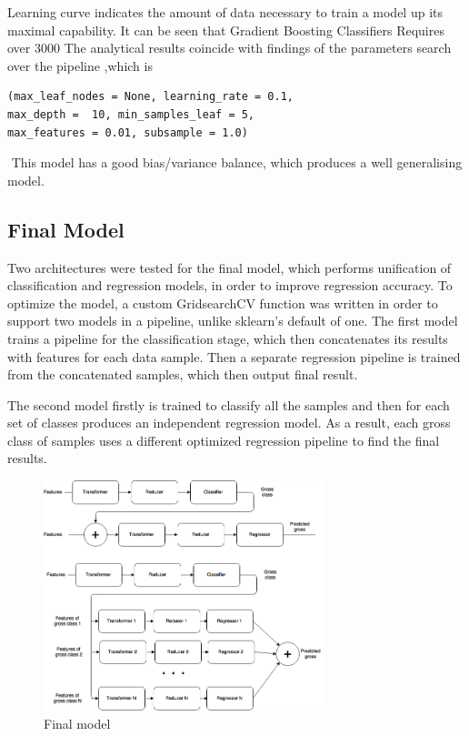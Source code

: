 Learning curve indicates the amount of data necessary to train a model up its maximal capability. It can be seen that Gradient Boosting Classifiers Requires over 3000
The analytical results coincide with findings of the parameters search over the pipeline ,which is \begin{verbatim}(max_leaf_nodes = None, learning_rate = 0.1,
max_depth =  10, min_samples_leaf = 5, 
max_features = 0.01, subsample = 1.0) \end{verbatim}­ This model has a good bias/variance balance, which produces a well generalising model.

\subsection{Final Model}
Two architectures were tested for the final model, which performs unification of classification and regression models, in order to improve regression accuracy. To optimize the model, a custom GridsearchCV function was written in order to support two models in a pipeline, unlike sklearn’s default of one. The first model trains a pipeline for the classification stage, which then concatenates its results with features for each data sample. Then a separate regression pipeline is trained from the concatenated samples, which then output final result.


The second model firstly is trained to classify all the samples and then for each set of classes produces an independent regression model. As a result, each gross class of samples uses a different optimized regression pipeline to find the final results.


\begin{figure}[h]
\centering
\includegraphics[width=3.2in]{figures/final_model}
\caption{Final model}
\label{fig:finalmodel}
\end{figure}

